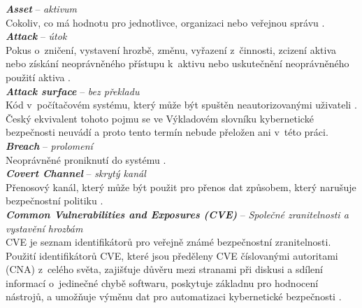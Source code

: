 \textit{\textbf{Asset}} -- \textit{aktivum} \label{app:a:asset} \\
Cokoliv, co má hodnotu pro jednotlivce, organizaci nebo veřejnou správu \cite[str. 17]{Slovnik2015}. \\

\textit{\textbf{Attack}} -- \textit{útok} \label{app:a:attack} \\ %
Pokus o~zničení, vystavení hrozbě, změnu, vyřazení z~činnosti, zcizení aktiva nebo získání neoprávněného přístupu k~aktivu nebo uskutečnění neoprávněného použití aktiva 
\cite[\mbox{str. 121}]{Slovnik2015}.  \\

\textit{\textbf{Attack surface}} -- \textit{bez překladu} \label{app:a:attacksurface} \\
Kód v~počítačovém systému, který může být spuštěn neautorizovanými uživateli \cite[\mbox{str. 20}]{Slovnik2015}. 
Český ekvivalent tohoto pojmu se ve Výkladovém slovníku kybernetické bezpečnosti \mbox{neuvádí} a proto tento termín nebude přeložen ani v~této práci. \\

\textit{\textbf{Breach}} -- \textit{prolomení} \label{app:a:breach} \\ %
Neoprávněné proniknutí do systému \cite[str. 92]{Slovnik2015}. \\

\textit{\textbf{Covert Channel}} -- \textit{skrytý kanál} \label{app:a:covertchannel} \\ %
Přenosový kanál, který může být použit pro přenos dat způsobem, který narušuje bezpečnostní politiku \cite[str. 104]{Slovnik2015}. \\

\textit{\textbf{Common Vulnerabilities and Exposures (CVE)}} -- \textit{Společné zranitelnosti a vystavění hrozbám} \label{app:a:cve} \\ %
CVE je seznam identifikátorů pro veřejně známé bezpečnostní zranitelnosti. Použití identifikátorů CVE, které jsou předěleny CVE číslovanými autoritami (CNA) z~celého světa, zajišťuje důvěru mezi stranami při diskusi a sdílení informací o~jedinečné chybě softwaru, poskytuje základnu pro hodnocení nástrojů, a umožňuje výměnu dat pro automatizaci \mbox{kybernetické} bezpečnosti \cite{CVEWeb}. \\

